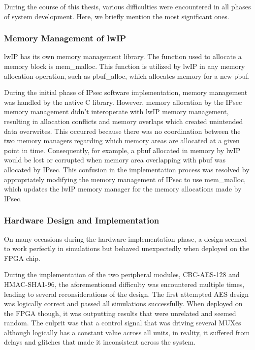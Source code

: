 
During the course of this thesis, various difficulties were encountered in all phases of system development. Here, we briefly mention the most significant ones.

\subsubsection*{Memory Management of lwIP}
lwIP has its own memory management library. The function used to allocate a memory block is mem\_malloc. This function is utilized by lwIP in any memory allocation operation, such as pbuf\_alloc, which allocates memory for a new pbuf.

During the initial phase of IPsec software implementation, memory management was handled by the native C library. However, memory allocation by the IPsec memory management didn't interoperate with lwIP memory management, resulting in allocation conflicts and memory overlaps which created unintended data overwrites. This occurred because there was no coordination between the two memory managers regarding which memory areas are allocated at a given point in time. Consequently, for example, a pbuf allocated in memory by lwIP would be lost or corrupted when memory area overlapping with pbuf was allocated by IPsec. This confusion in the implementation process was resolved by appropriately modifying the memory management of IPsec to use mem\_malloc, which updates the lwIP memory manager for the memory allocations made by IPsec.

\subsubsection*{Hardware Design and Implementation}
On many occasions during the hardware implementation phase, a design seemed to work perfectly in simulations but behaved unexpectedly when deployed on the FPGA chip.

During the implementation of the two peripheral modules, CBC-AES-128 and HMAC-SHA1-96, the aforementioned difficulty was encountered multiple times, leading to several reconsiderations of the design. The first attempted AES design was logically correct and passed all simulations successfully. When deployed on the FPGA though, it was outputting results that were unrelated and seemed random. The culprit was that a control signal that was driving several MUXes although logically has a constant value across all units, in reality, it suffered from delays and glitches that made it inconsistent across the system.

